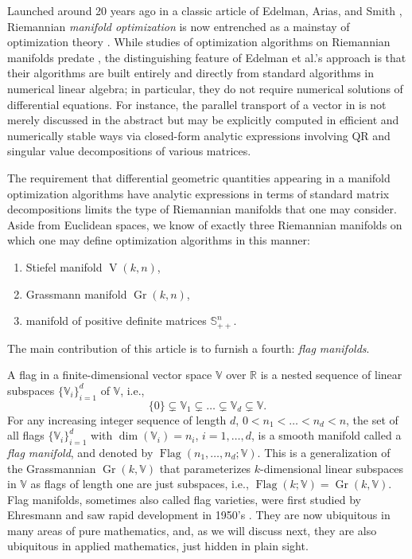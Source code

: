 \documentclass[11pt,reqno]{amsart}%
\theoremstyle{definition}
\theoremstyle{remark}
\DeclareMathOperator{\Gr}{Gr}
\DeclareMathOperator{\V}{V}
\DeclareMathOperator{\Flag}{Flag}
\newcommand{\pp}{{\plus\plus}}
\begin{document}
Launched around 20 years ago in a classic article of Edelman, Arias, and Smith \cite{EAS},  Riemannian \emph{manifold optimization}  is now entrenched as a mainstay of optimization theory \cite{ABG2007,AMS2009,CDH2011,WY2013}. While studies of optimization algorithms on Riemannian manifolds predate \cite{EAS}, the distinguishing feature of  Edelman et al.'s approach is that their algorithms are built entirely and directly from standard algorithms in numerical linear algebra; in particular, they do not require numerical solutions of differential equations. For instance, the parallel transport of a vector in \cite{EAS} is not merely discussed in the abstract but may be explicitly computed in efficient and numerically stable ways via closed-form analytic expressions involving QR and singular value decompositions of various matrices.

The requirement that differential geometric quantities appearing in a manifold optimization algorithms have analytic expressions in terms of standard matrix decompositions limits the type of Riemannian manifolds that one may  consider. Aside from Euclidean spaces, we know of exactly three Riemannian manifolds \cite{AMS2009} on which one may define optimization algorithms in this manner:
\begin{enumerate}[\upshape (i)]
\item\label{it:V} Stiefel manifold $\V(k,n)$,
\item\label{it:Gr} Grassmann manifold $\Gr(k,n)$,
\item manifold of positive definite matrices $\mathbb{S}^n_{\pp}$.
\end{enumerate}
The main contribution of this article is to furnish a fourth: \emph{flag manifolds}.

A flag in a finite-dimensional vector space $\mathbb{V}$ over $\mathbb{R}$ is a nested sequence of linear subspaces $\{\mathbb{V}_i\}_{i=1}^d$ of $\mathbb{V}$, i.e.,
\[
\{0\} \subsetneq \mathbb{V}_1 \subsetneq \dots \subsetneq \mathbb{V}_d \subsetneq \mathbb{V}.
\]
For any increasing integer sequence of length $d$, $0 < n_1 < \dots < n_d < n$, the set of all flags $\{\mathbb{V}_i\}_{i=1}^d$  with $\dim (\mathbb{V}_i) = n_i$, $i=1, \dots, d$, is a smooth manifold called a \emph{flag manifold}, and denoted by $\Flag(n_1,\dots,n_d;\mathbb{V})$. This is  a generalization of the Grassmannian $\Gr(k, \mathbb{V})$ that parameterizes $k$-dimensional linear subspaces in $\mathbb{V}$  as flags of length one are just subspaces, i.e.,  $\Flag(k; \mathbb{V}) =\Gr(k, \mathbb{V})$. Flag manifolds,  sometimes also called flag varieties, were first studied by Ehresmann \cite{Ehresmann1934} and saw rapid development in 1950's \cite{borel1953b,borel1953a,Borel1953,chern1953}. They are now ubiquitous in many areas of pure mathematics, and, as we will discuss next, they are also ubiquitous in applied mathematics, just hidden in plain sight.
\end{document}
